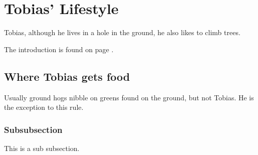 \documentclass{article}
\begin{document}
\newpage
\section{Tobias' Lifestyle}
Tobias, although he lives in a hole in the ground, he also likes to climb trees.

The introduction is found on page \pageref{sec:intro}.

\subsection{Where Tobias gets food}
Usually ground hogs nibble on greens found on the ground, but not Tobias. He is the exception to this rule.
\subsubsection{Subsubsection}
This is a sub subsection.
\end{document}
